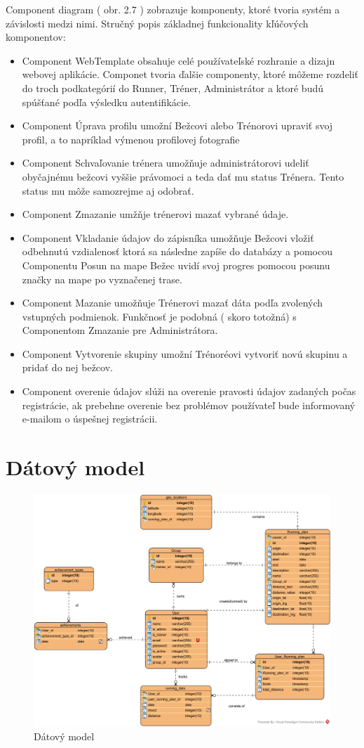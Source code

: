 \documentclass[12pt,a4paper]{report}
\theoremstyle{definition}
\theoremstyle{remark}
\begin{document}
Component diagram ( obr. 2.7 ) zobrazuje komponenty, ktoré tvoria systém a závislosti medzi nimi. Stručný popis základnej funkcionality kľúčových komponentov:
\begin{itemize}
	\item Component WebTemplate obsahuje celé používateľské rozhranie a dizajn webovej aplikácie. Componet tvoria ďalšie componenty, ktoré môžeme rozdeliť do troch podkategórií do Runner, Tréner, Administrátor a ktoré budú spúšťané podľa výsledku autentifikácie.
	\item Component Úprava profilu umožní Bežcovi alebo Trénorovi upraviť svoj profil, a to napríklad výmenou profilovej fotografie
	\item Component Schvaľovanie trénera umožňuje administrátorovi udeliť obyčajnému bežcovi vyššie právomoci a teda dať mu status Trénera. Tento status mu môže samozrejme aj odobrať.
	\item Component Zmazanie umžňje trénerovi mazať vybrané údaje.
  	\item Component Vkladanie údajov do zápisníka umožňuje Bežcovi vložiť odbehnutú vzdialenosť ktorá sa následne zapíše do databázy a pomocou Componentu Posun na mape Bežec uvidí svoj progres pomocou posunu značky na mape po vyznačenej trase.
	\item Component Mazanie umožňuje Trénerovi mazať dáta podľa zvolených vstupných podmienok. Funkčnosť je podobná ( skoro totožná) s Componentom Zmazanie pre Administrátora.
	\item Component Vytvorenie skupiny umožní Trénoréovi vytvoriť novú skupinu a pridať do nej bežcov.
	\item Component overenie údajov slúži na overenie pravosti údajov zadaných počas registrácie, ak prebehne overenie bez problémov používateľ bude informovaný e-mailom o úspešnej registrácii.
\end{itemize}


\newpage
\chapter{Dátový model}
\begin{figure}[H]
\centering
\includegraphics[width=\textwidth]{data_model_updated.png}
\caption{Dátový model}
\end{figure}
\end{document}
